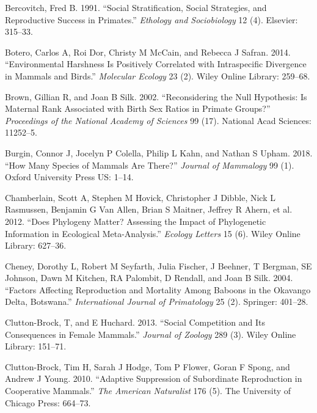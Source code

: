 \documentclass[]{article}
\begin{document}
\leavevmode\hypertarget{ref-bercovitch1991social}{}%
Bercovitch, Fred B. 1991. ``Social Stratification, Social Strategies,
and Reproductive Success in Primates.'' \emph{Ethology and Sociobiology}
12 (4). Elsevier: 315--33.

\leavevmode\hypertarget{ref-botero2014environmental}{}%
Botero, Carlos A, Roi Dor, Christy M McCain, and Rebecca J Safran. 2014.
``Environmental Harshness Is Positively Correlated with Intraspecific
Divergence in Mammals and Birds.'' \emph{Molecular Ecology} 23 (2).
Wiley Online Library: 259--68.

\leavevmode\hypertarget{ref-brown2002reconsidering}{}%
Brown, Gillian R, and Joan B Silk. 2002. ``Reconsidering the Null
Hypothesis: Is Maternal Rank Associated with Birth Sex Ratios in Primate
Groups?'' \emph{Proceedings of the National Academy of Sciences} 99
(17). National Acad Sciences: 11252--5.

\leavevmode\hypertarget{ref-burgin2018many}{}%
Burgin, Connor J, Jocelyn P Colella, Philip L Kahn, and Nathan S Upham.
2018. ``How Many Species of Mammals Are There?'' \emph{Journal of
Mammalogy} 99 (1). Oxford University Press US: 1--14.

\leavevmode\hypertarget{ref-chamberlain2012does}{}%
Chamberlain, Scott A, Stephen M Hovick, Christopher J Dibble, Nick L
Rasmussen, Benjamin G Van Allen, Brian S Maitner, Jeffrey R Ahern, et
al. 2012. ``Does Phylogeny Matter? Assessing the Impact of Phylogenetic
Information in Ecological Meta-Analysis.'' \emph{Ecology Letters} 15
(6). Wiley Online Library: 627--36.

\leavevmode\hypertarget{ref-cheney2004factors}{}%
Cheney, Dorothy L, Robert M Seyfarth, Julia Fischer, J Beehner, T
Bergman, SE Johnson, Dawn M Kitchen, RA Palombit, D Rendall, and Joan B
Silk. 2004. ``Factors Affecting Reproduction and Mortality Among Baboons
in the Okavango Delta, Botswana.'' \emph{International Journal of
Primatology} 25 (2). Springer: 401--28.

\leavevmode\hypertarget{ref-clutton2013social}{}%
Clutton-Brock, T, and E Huchard. 2013. ``Social Competition and Its
Consequences in Female Mammals.'' \emph{Journal of Zoology} 289 (3).
Wiley Online Library: 151--71.

\leavevmode\hypertarget{ref-clutton2010adaptive}{}%
Clutton-Brock, Tim H, Sarah J Hodge, Tom P Flower, Goran F Spong, and
Andrew J Young. 2010. ``Adaptive Suppression of Subordinate Reproduction
in Cooperative Mammals.'' \emph{The American Naturalist} 176 (5). The
University of Chicago Press: 664--73.
\end{document}
